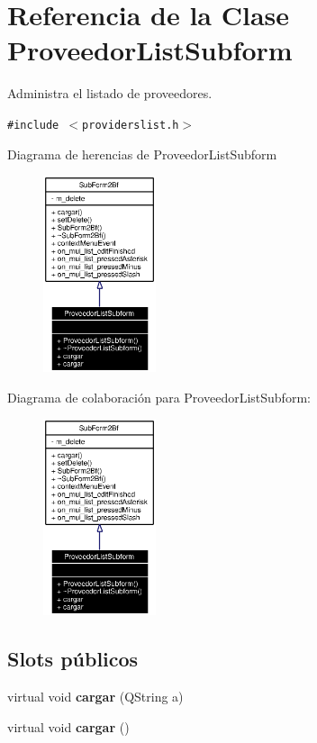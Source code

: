 \section{Referencia de la Clase Proveedor\-List\-Subform}
\label{classProveedorListSubform}
Administra el listado de proveedores.  


{\tt \#include $<$providerslist.h$>$}

Diagrama de herencias de Proveedor\-List\-Subform\begin{figure}[H]
\begin{center}
\leavevmode
\includegraphics[width=94pt]{classProveedorListSubform__inherit__graph}
\end{center}
\end{figure}
Diagrama de colaboraci\'{o}n para Proveedor\-List\-Subform:\begin{figure}[H]
\begin{center}
\leavevmode
\includegraphics[width=94pt]{classProveedorListSubform__coll__graph}
\end{center}
\end{figure}
\subsection*{Slots p\'{u}blicos}
\begin{CompactItemize}
\item 
virtual void {\bf cargar} (QString a)\label{classProveedorListSubform_i0}

\item 
virtual void {\bf cargar} ()\label{classProveedorListSubform_i1}

\end{CompactItemize}
